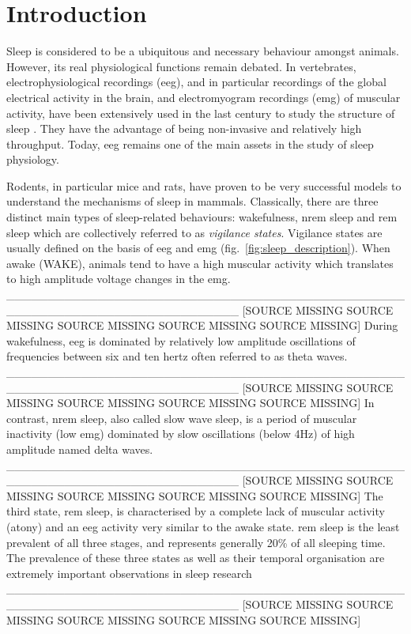 \section{Introduction} \label{intro}

Sleep is considered to be a ubiquitous and necessary behaviour amongst
animals\cite{siegel_all_2008,cirelli_is_2008}.
However, its real physiological functions remain debated.
In vertebrates, electrophysiological recordings (\gls{eeg}), and in particular recordings of the global electrical activity in the brain,
and electromyogram recordings (\gls{emg}) of muscular activity,
have been extensively used in the last
century to study the structure of sleep \cite{loomis_distribution_1938,aserinsky_regularly_1953}.
They have the advantage of being non-invasive and relatively high throughput.
Today, \gls{eeg} remains one of the main assets in the study of sleep physiology.

Rodents, in particular mice and rats, have proven to be very successful models to
understand the mechanisms of sleep in mammals\cite{toth_animal_2013}.
Classically, there are three distinct main types of sleep-related behaviours: wakefulness, \gls{nrem} sleep and \gls{rem} 
sleep which are collectively referred to as \emph{vigilance states}.
Vigilance states are usually defined on the basis of \gls{eeg} and \gls{emg} (fig.~\ref{fig:sleep_description}).
When awake (WAKE), animals tend to have a high muscular activity which translates to high amplitude voltage changes in the \gls{emg}.
____________________________________________________________________________
[SOURCE MISSING SOURCE MISSING SOURCE MISSING SOURCE MISSING SOURCE MISSING]
During wakefulness, \gls{eeg} is dominated by relatively low amplitude oscillations of frequencies
between six and ten hertz often referred to as theta waves. 
____________________________________________________________________________
[SOURCE MISSING SOURCE MISSING SOURCE MISSING SOURCE MISSING SOURCE MISSING]
In contrast, \gls{nrem} sleep, also called slow wave sleep, is a period of muscular inactivity (low \gls{emg})
dominated by slow oscillations (below 4Hz) of high amplitude named delta waves.
____________________________________________________________________________
[SOURCE MISSING SOURCE MISSING SOURCE MISSING SOURCE MISSING SOURCE MISSING]
The third state, \gls{rem} sleep, is characterised by a complete lack of muscular activity (atony) and an \gls{eeg} activity very similar to the awake state.
\gls{rem} sleep is the least prevalent of all three stages, and represents generally  20\% of all sleeping time.
The prevalence of these three states as well as their temporal organisation are extremely important observations in sleep research
____________________________________________________________________________
[SOURCE MISSING SOURCE MISSING SOURCE MISSING SOURCE MISSING SOURCE MISSING]

